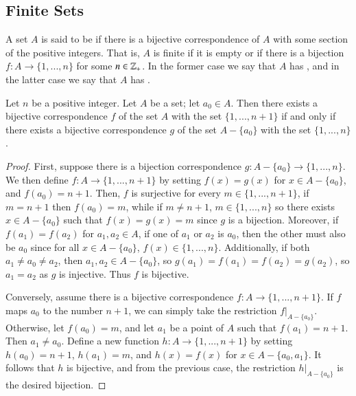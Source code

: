 \documentclass[12pt, a4paper, oneside, openright, titlepage]{book}
\begin{document}
\begin{appendices}
    \section{Finite Sets}

    \begin{definition}
        A set $A$ is said to be  if there is a bijective correspondence of $A$ with some section of the positive integers. That is, $A$ is finite if it is empty or if there is a bijection $f:A\rightarrow \{1,...,n\}$ for some $n \in \mathbb Z_+$. In the former case we say that $A$ has , and in the latter case we say that $A$ has .
    \end{definition}

    \begin{lemma}
        Let $n$ be a positive integer. Let $A$ be a set; let $a_0 \in A$. Then there exists a bijective correspondence $f$ of the set $A$ with the set $\{1,...,n+1\}$ if and only if there exists a bijective correspondence $g$ of the set $A-\{a_0\}$ with the set $\{1,...,n\}$.
    \end{lemma}
    \begin{proof}
        First, suppose there is a bijection correspondence $g:A-\{a_0\}\rightarrow \{1,...,n\}$. We then define $f:A\rightarrow \{1,...,n+1\}$ by setting $f(x) = g(x)$ for $x \in A-\{a_0\}$, and $f(a_0) = n+1$. Then, $f$ is surjective for every $m \in \{1,...,n+1\}$, if $m = n+1$ then $f(a_0) = m$, while if $m \neq n+1$, $m \in \{1,...,n\}$ so there exists $x \in A-\{a_0\}$ such that $f(x) = g(x) = m$ since $g$ is a bijection. Moreover, if $f(a_1) = f(a_2)$ for $a_1,a_2 \in A$, if one of $a_1$ or $a_2$ is $a_0$, then the other must also be $a_0$ since for all $x \in A-\{a_0\}$, $f(x) \in \{1,...,n\}$. Additionally, if both $a_1 \neq a_0 \neq a_2$, then $a_1,a_2 \in A-\{a_0\}$, so $g(a_1) = f(a_1) = f(a_2) = g(a_2)$, so $a_1 = a_2$ as $g$ is injective. Thus $f$ is bijective. 

        Conversely, assume there is a bijective correspondence $f:A\rightarrow \{1,...,n+1\}$. If $f$ maps $a_0$ to the number $n+1$, we can simply take the restriction $f\rvert_{A-\{a_0\}}$. Otherwise, let $f(a_0) = m$, and let $a_1$ be a point of $A$ such that $f(a_1) = n+1$. Then $a_1 \neq a_0$. Define a new function $h:A\rightarrow \{1,...,n+1\}$ by setting $h(a_0) = n+1$, $h(a_1) = m$, and $h(x) = f(x)$ for $x \in A-\{a_0,a_1\}$. It follows that $h$ is bijective, and from the previous case, the restriction $h\rvert_{A-\{a_0\}}$ is the desired bijection.
    \end{proof}



\end{appendices}
\end{document}
